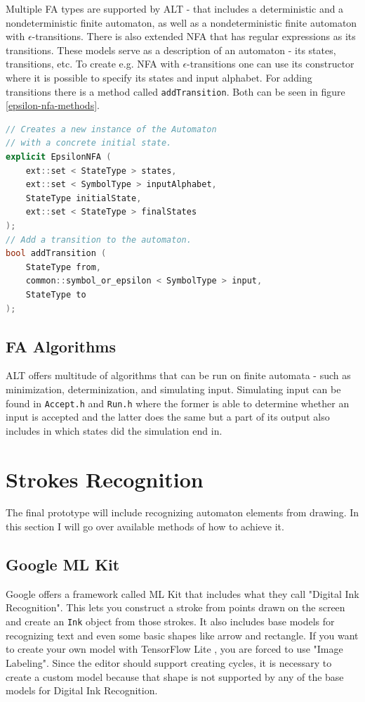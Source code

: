 Multiple FA types are supported by ALT - that includes a deterministic and a nondeterministic finite automaton, as well as a nondeterministic finite automaton with $\epsilon$-transitions. There is also extended NFA that has regular expressions as its transitions. These models serve as a description of an automaton - its states, transitions, etc. To create e.g. NFA with $\epsilon$-transitions one can use its constructor where it is possible to specify its states and input alphabet. For adding transitions there is a method called \lstinline{addTransition}. Both can be seen in figure \ref{epsilon-nfa-methods}.

\begin{lstlisting}[language=C++, caption=EpsilonNFA example methods, label=epsilon-nfa-methods]
// Creates a new instance of the Automaton
// with a concrete initial state.
explicit EpsilonNFA ( 
    ext::set < StateType > states,
    ext::set < SymbolType > inputAlphabet, 
    StateType initialState, 
    ext::set < StateType > finalStates
);
// Add a transition to the automaton.
bool addTransition ( 
    StateType from,
    common::symbol_or_epsilon < SymbolType > input,
    StateType to 
);
\end{lstlisting}

\subsection{FA Algorithms}

ALT offers multitude of algorithms that can be run on finite automata - such as minimization, determinization, and simulating input. Simulating input can be found in \lstinline{Accept.h} and \lstinline{Run.h} where the former is able to determine whether an input is accepted and the latter does the same but a part of its output also includes in which states did the simulation end in.

\section{Strokes Recognition}

The final prototype will include recognizing automaton elements from drawing. In this section I will go over available methods of how to achieve it.

\subsection{Google ML Kit}

Google offers a framework called ML Kit that includes what they call "Digital Ink Recognition". This lets you construct a stroke from points drawn on the screen and create an \lstinline{Ink} object from those strokes. It also includes base models for recognizing text and even some basic shapes like arrow and rectangle. If you want to create your own model with TensorFlow Lite \cite{tensorflow}, you are forced to use "Image Labeling". Since the editor should support creating cycles, it is necessary to create a custom model because that shape is not supported by any of the base models for Digital Ink Recognition.

